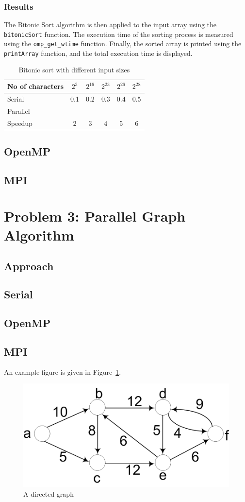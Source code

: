 \subsubsection*{Results}
The Bitonic Sort algorithm is then applied to the input array using the \texttt{bitonicSort} function. The execution time of the sorting process is measured using the \texttt{omp\_get\_wtime} function. Finally, the sorted array is printed using the \texttt{printArray} function, and the total execution time is displayed.
\begin{table}[htb]
	\centering
	\caption{Bitonic sort with different input sizes}\label{tab:example}
	\begin{tabular}{l|ccccc}
		\toprule
		No of characters & $2^3$ & $2^{16}$ & $2^{23}$ & $2^{26}$ & $2^{28}$\\
		\midrule
		Serial &0.1&0.2&0.3&0.4&0.5\\
		Parallel &&&&\\
		Speedup &2&3&4&5&6\\
		\bottomrule
	\end{tabular}
\end{table} 
\subsection{OpenMP} 
\subsection{MPI}
\pagebreak
\section{Problem 3: Parallel Graph Algorithm}
\subsection*{Approach}
\subsection{Serial}
\subsection{OpenMP}
\subsection{MPI}
An example figure is given in Figure~\ref{fig:sp_fig1}.
\begin{figure}[htb]
	\centering
	\includegraphics[width=0.5\linewidth]{pics/sp_fig1.png}
	\caption{A directed graph}\label{fig:sp_fig1}
\end{figure}

